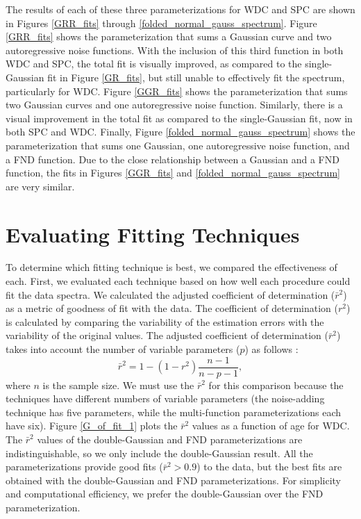 \documentclass[draft, jgrga]{AGUTeX}
\begin{document}
\begin{article}
The results of each of these three parameterizations for WDC and SPC are shown in Figures \ref{GRR_fits} through \ref{folded_normal_gauss_spectrum}. Figure \ref{GRR_fits} shows the parameterization that sums a Gaussian curve and two autoregressive noise functions. With the inclusion of this third function in both WDC and SPC, the total fit is visually improved, as compared to the single-Gaussian fit in Figure \ref{GR_fits}, but still unable to effectively fit the spectrum, particularly for WDC. Figure \ref{GGR_fits} shows the parameterization that sums two Gaussian curves and one autoregressive noise function. Similarly, there is a visual improvement in the total fit as compared to the single-Gaussian fit, now in both SPC and WDC. Finally, Figure \ref{folded_normal_gauss_spectrum} shows the parameterization that sums one Gaussian, one autoregressive noise function, and a FND function. Due to the close relationship between a Gaussian and a FND function, the fits in Figures \ref{GGR_fits} and \ref{folded_normal_gauss_spectrum} are very similar.


\section{Evaluating Fitting Techniques}
To determine which fitting technique is best, we compared the effectiveness of each. First, we evaluated each technique based on how well each procedure could fit the data spectra. We calculated the adjusted coefficient of determination ($\bar{r}^2$) as a metric of goodness of fit with the data. The coefficient of determination ($r^2$) is calculated by comparing the variability of the estimation errors with the variability of the original values. The adjusted coefficient of determination ($\bar{r}^2$) takes into account the number of variable parameters ($p$) as follows \citep{Theil1961}:
\begin{equation}
\bar{r}^2 = 1 - (1 -r^2) \frac{n - 1}{n - p - 1},
\end{equation}
where $n$ is the sample size. We must use the $\bar{r}^2$ for this comparison because the techniques have different numbers of variable parameters (the noise-adding technique has five parameters, while the multi-function parameterizations each have six). Figure \ref{G_of_fit_1} plots the $\bar{r}^2$ values as a function of age for WDC. The $\bar{r}^2$ values of the double-Gaussian and FND parameterizations are indistinguishable, so we only include the double-Gaussian result. All the parameterizations provide good fits ($\bar{r}^2 > 0.9$) to the data, but the best fits are obtained with the double-Gaussian and FND parameterizations. For simplicity and computational efficiency, we prefer the double-Gaussian over the FND parameterization.


\end{article}
\end{document}
